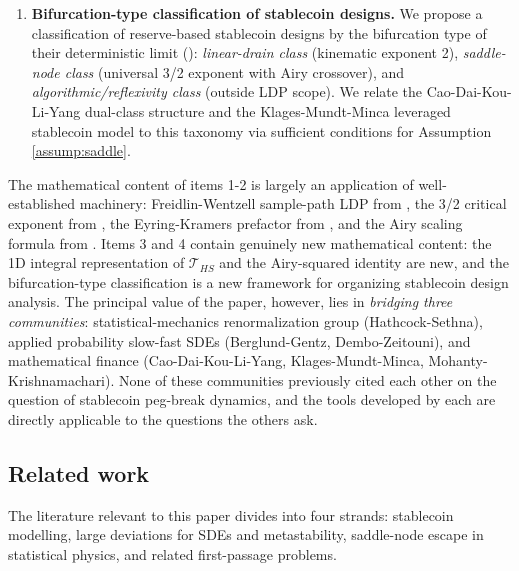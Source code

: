 \documentclass[11pt,a4paper]{article}
\theoremstyle{plain}
\theoremstyle{definition}
\newcommand{\R}{\mathbb{R}}
\renewcommand{\d}{\mathrm{d}}
\newcommand{\Ai}{\operatorname{Ai}}
\newcommand{\Bi}{\operatorname{Bi}}
\begin{document}
\begin{enumerate}
    $$\int_0^\infty t^{-1/2}\,e^{2\eta t - t^3/6}\,\d t = 2^{-1/6}\pi^{3/2}\big[\Ai^2(2^{2/3}\eta) + \Bi^2(2^{2/3}\eta)\big],\quad \eta \in \R,$$
    which does not appear to have been recorded in standard Airy function references.
    The derivation is elementary and provides an alternative route to Hathcock-Sethna's Eq.~15 that bypasses their Schr\"odinger spectral analysis.
\item \textbf{Bifurcation-type classification of stablecoin designs.}
    We propose a classification of reserve-based stablecoin designs by the bifurcation type of their deterministic limit (): \emph{linear-drain class} (kinematic exponent 2), \emph{saddle-node class} (universal 3/2 exponent with Airy crossover), and \emph{algorithmic/reflexivity class} (outside LDP scope). We relate the Cao-Dai-Kou-Li-Yang dual-class structure \cite{CaoDaiKouLiYang2025} and the Klages-Mundt-Minca leveraged stablecoin model \cite{KlagesMundtMinca2022} to this taxonomy via sufficient conditions for Assumption \ref{assump:saddle}.
\end{enumerate}

The mathematical content of items 1-2 is largely an application of well-established machinery: Freidlin-Wentzell sample-path LDP from \cite{DemboZeitouni2010}, the 3/2 critical exponent from \cite{DykmanMoriRossHunt1994, BerglundGentz2006}, the Eyring-Kramers prefactor from \cite{Berglund2013}, and the Airy scaling formula from \cite{HathcockSethna2021}.
Items 3 and 4 contain genuinely new mathematical content: the 1D integral representation of $\mathcal T_{HS}$ and the Airy-squared identity are new, and the bifurcation-type classification is a new framework for organizing stablecoin design analysis.
The principal value of the paper, however, lies in \emph{bridging three communities}: statistical-mechanics renormalization group (Hathcock-Sethna), applied probability slow-fast SDEs (Berglund-Gentz, Dembo-Zeitouni), and mathematical finance (Cao-Dai-Kou-Li-Yang, Klages-Mundt-Minca, Mohanty-Krishnamachari).
None of these communities previously cited each other on the question of stablecoin peg-break dynamics, and the tools developed by each are directly applicable to the questions the others ask.

\subsection{Related work}
\label{sec:related}

The literature relevant to this paper divides into four strands: stablecoin modelling, large deviations for SDEs and metastability, saddle-node escape in statistical physics, and related first-passage problems.
\end{document}
